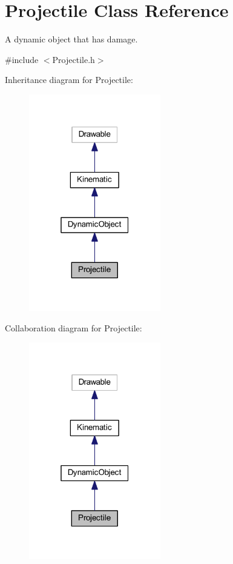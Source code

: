\hypertarget{class_projectile}{}\section{Projectile Class Reference}
\label{class_projectile}


A dynamic object that has damage.  




{\ttfamily \#include $<$Projectile.\+h$>$}



Inheritance diagram for Projectile\+:\nopagebreak
\begin{figure}[H]
\begin{center}
\leavevmode
\includegraphics[width=163pt]{class_projectile__inherit__graph}
\end{center}
\end{figure}


Collaboration diagram for Projectile\+:\nopagebreak
\begin{figure}[H]
\begin{center}
\leavevmode
\includegraphics[width=163pt]{class_projectile__coll__graph}
\end{center}
\end{figure}
